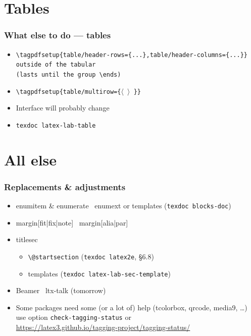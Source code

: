 \documentclass{ltx-talk}
\newcommand{\cs}[1]{\texttt{\textbackslash #1}}
\newcommand{\tubbraced}[1]{\texttt{\{#1\}}}
\newcommand{\meta}[1]{\ensuremath{\langle}%
 \ifmmode\expandafter\mbox\fi{\itshape #1\/}%
 \ensuremath{\rangle}%
}
\begin{document}
\section{Tables}

\begin{frame}
\frametitle{What else to do --- tables}
\begin{itemize}
\item\texttt{\cs{tagpdfsetup}\tubbraced{table/header-rows=\tubbraced{...},table/header-columns=\tubbraced{...}}\\
\qquad\qquad \textrm{outside of the} tabular\\
\qquad\qquad \textrm{(lasts until the group} \cs{ends})}
\item\texttt{\cs{tagpdfsetup}\tubbraced{table/multirow=\tubbraced{\meta{number of rows}}}} 
\item Interface will probably change
\item \texttt{texdoc latex-lab-table}
\end{itemize}
\end{frame}

\section{All else}

\begin{frame}
\frametitle{Replacements \& adjustments}
\begin{itemize}
\item enumitem \& enumerate \textrightarrow\ enumext or templates (\texttt{texdoc blocks-doc})
\item margin[fit|fix|note] \textrightarrow\ margin[alia|par]
\item titlesec \textrightarrow
\begin{itemize}
\item \cs{@startsection} (\texttt{texdoc latex2e}, \S6.8)
\item templates (\texttt{texdoc latex-lab-sec-template})
\end{itemize}
\item Beamer \textrightarrow\ ltx-talk (tomorrow)
\item Some packages need some (or a lot of) help (tcolorbox, qrcode, media9, \ldots)\\
use option \texttt{check-tagging-status} or\\
\url{https://latex3.github.io/tagging-project/tagging-status/}
\end{itemize}
\end{frame}
\end{document}
